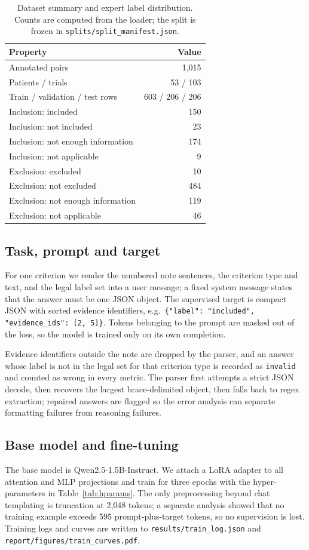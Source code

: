 \documentclass[conference]{IEEEtran}
\begin{document}
\begin{table}[t]
\centering
\caption{Dataset summary and expert label distribution. Counts are computed from the loader; the
split is frozen in \texttt{splits/split\_manifest.json}.}
\label{tab:data}
\begin{tabular}{lr}
\toprule
Property & Value \\
\midrule
Annotated pairs & 1{,}015 \\
Patients / trials & 53 / 103 \\
Train / validation / test rows & 603 / 206 / 206 \\
\midrule
Inclusion: included & 150 \\
Inclusion: not included & 23 \\
Inclusion: not enough information & 174 \\
Inclusion: not applicable & 9 \\
Exclusion: excluded & 10 \\
Exclusion: not excluded & 484 \\
Exclusion: not enough information & 119 \\
Exclusion: not applicable & 46 \\
\bottomrule
\end{tabular}
\end{table}

\subsection{Task, prompt and target}
For one criterion we render the numbered note sentences, the criterion type and text, and the legal
label set into a user message; a fixed system message states that the answer must be one JSON
object. The supervised target is compact JSON with sorted evidence identifiers,
e.g.\ \texttt{\{"label": "included", "evidence\_ids": [2, 5]\}}. Tokens belonging to the prompt are
masked out of the loss, so the model is trained only on its own completion.

Evidence identifiers outside the note are dropped by the parser, and an answer whose label is not in
the legal set for that criterion type is recorded as \texttt{invalid} and counted as wrong in every
metric. The parser first attempts a strict JSON decode, then recovers the largest brace-delimited
object, then falls back to regex extraction; repaired answers are flagged so the error analysis can
separate formatting failures from reasoning failures.

\subsection{Base model and fine-tuning}
The base model is Qwen2.5-1.5B-Instruct. We attach a LoRA adapter to all attention and MLP
projections and train for three epochs with the hyper-parameters in Table~\ref{tab:hparams}. The
only preprocessing beyond chat templating is truncation at 2{,}048 tokens; a separate analysis
showed that no training example exceeds 595 prompt-plus-target tokens, so no supervision is lost.
Training logs and curves are written to \texttt{results/train\_log.json} and
\texttt{report/figures/train\_curves.pdf}.
\end{document}
